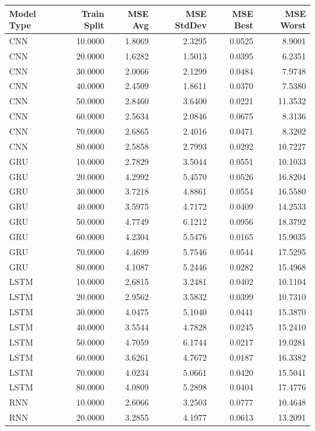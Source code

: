 \begin{tabular}{lrrrrr}
\toprule
Model Type & Train Split & MSE Avg & MSE StdDev & MSE Best & MSE Worst \\
\midrule
CNN & 10.0000 & 1.8069 & 2.3295 & 0.0525 & 8.9001 \\
CNN & 20.0000 & 1.6282 & 1.5013 & 0.0395 & 6.2351 \\
CNN & 30.0000 & 2.0066 & 2.1299 & 0.0484 & 7.9748 \\
CNN & 40.0000 & 2.4509 & 1.8611 & 0.0370 & 7.5380 \\
CNN & 50.0000 & 2.8460 & 3.6400 & 0.0221 & 11.3532 \\
CNN & 60.0000 & 2.5634 & 2.0846 & 0.0675 & 8.3136 \\
CNN & 70.0000 & 2.6865 & 2.4016 & 0.0471 & 8.3202 \\
CNN & 80.0000 & 2.5858 & 2.7993 & 0.0292 & 10.7227 \\
GRU & 10.0000 & 2.7829 & 3.5044 & 0.0551 & 10.1033 \\
GRU & 20.0000 & 4.2992 & 5.4570 & 0.0526 & 16.8204 \\
GRU & 30.0000 & 3.7218 & 4.8861 & 0.0554 & 16.5580 \\
GRU & 40.0000 & 3.5975 & 4.7172 & 0.0409 & 14.2533 \\
GRU & 50.0000 & 4.7749 & 6.1212 & 0.0956 & 18.3792 \\
GRU & 60.0000 & 4.2304 & 5.5476 & 0.0165 & 15.9035 \\
GRU & 70.0000 & 4.4699 & 5.7546 & 0.0544 & 17.5295 \\
GRU & 80.0000 & 4.1087 & 5.2446 & 0.0282 & 15.4968 \\
LSTM & 10.0000 & 2.6815 & 3.2481 & 0.0402 & 10.1104 \\
LSTM & 20.0000 & 2.9562 & 3.5832 & 0.0399 & 10.7310 \\
LSTM & 30.0000 & 4.0475 & 5.1040 & 0.0441 & 15.3870 \\
LSTM & 40.0000 & 3.5544 & 4.7828 & 0.0245 & 15.2410 \\
LSTM & 50.0000 & 4.7059 & 6.1744 & 0.0217 & 19.0281 \\
LSTM & 60.0000 & 3.6261 & 4.7672 & 0.0187 & 16.3382 \\
LSTM & 70.0000 & 4.0234 & 5.0661 & 0.0420 & 15.5041 \\
LSTM & 80.0000 & 4.0809 & 5.2898 & 0.0404 & 17.4776 \\
RNN & 10.0000 & 2.6066 & 3.2503 & 0.0777 & 10.4648 \\
RNN & 20.0000 & 3.2855 & 4.1977 & 0.0613 & 13.2091 \\

\end{tabular}
